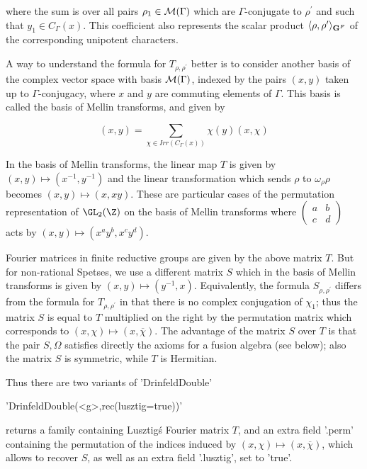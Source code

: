 where  the  sum  is  over  all  pairs $\rho_1\in{\cal M}(\Gamma)$ which are
$\Gamma$-conjugate  to  $\rho^\prime$  and  such that $y_1\in C_\Gamma(x)$.
This coefficient also represents the scalar product
$\langle\rho,\rho^\prime\rangle_{{\bf G}^F}$  of  the  corresponding  unipotent
characters.

A  way to  understand the  formula for  $T_{\rho,\rho^\prime}$ better is to
consider  another  basis  of  the  complex  vector  space with basis ${\cal
M}(\Gamma)$,  indexed by the pairs  $(x,y)$ taken up to $\Gamma$-conjugacy,
where  $x$ and $y$ are commuting elements of $\Gamma$. This basis is called
the basis of Mellin transforms, and given by\:

$$(x,y)=\sum_{\chi\in Irr(C_\Gamma(x))}\chi(y)(x,\chi)$$

In  the  basis  of  Mellin  transforms,  the  linear  map  $T$  is given by
$(x,y)\mapsto(x^{-1},y^{-1})$  and  the  linear  transformation which sends
$\rho$   to  $\omega_\rho\rho$  becomes   $(x,y)\mapsto(x,xy)$.  These  are
particular  cases of the  permutation representation of  $\GL_2(\Z)$ on the
basis of Mellin transforms where
$\left(\begin{array}{cc}a&b\\c&d\end{array}\right)$
acts by $(x,y)\mapsto(x^ay^b,x^cy^d)$.

Fourier  matrices in finite reductive groups  are given by the above matrix
$T$.  But for non-rational Spetses, we use  a different matrix $S$ which in
the  basis  of  Mellin  transforms  is  given  by $(x,y)\mapsto(y^{-1},x)$.
Equivalently,  the formula $S_{\rho,\rho^\prime}$  differs from the formula
for  $T_{\rho,\rho^\prime}$  in  that  there  is  no complex conjugation of
$\chi_1$;  thus the matrix $S$  is equal to $T$  multiplied on the right by
the permutation matrix which corresponds to
$(x,\chi)\mapsto(x,\overline\chi)$.  The advantage  of the  matrix $S$ over
$T$  is that the pair $S,\Omega$ satisfies directly the axioms for a fusion
algebra  (see  below);  also  the  matrix  $S$  is  symmetric, while $T$ is
Hermitian.

Thus there are two variants of 'DrinfeldDouble'\:

'DrinfeldDouble(<g>,rec(lusztig\:=true))'

returns  a family  containing Lusztig\'s  Fourier matrix  $T$, and an extra
field  '.perm'  containing  the  permutation  of  the  indices  induced  by
$(x,\chi)\mapsto(x,\overline\chi)$, which allows to recover $S$, as well as
an extra field '.lusztig', set to 'true'.

